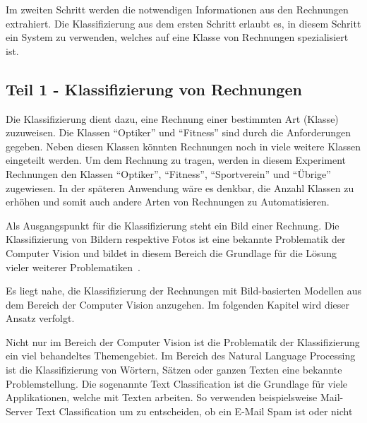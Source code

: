 Im zweiten Schritt werden die notwendigen Informationen aus den Rechnungen extrahiert. Die Klassifizierung aus dem ersten Schritt erlaubt es, in diesem Schritt ein System zu verwenden, welches auf eine Klasse von Rechnungen spezialisiert ist. 

\subsection{Teil 1 - Klassifizierung von Rechnungen}

Die Klassifizierung dient dazu, eine Rechnung einer bestimmten Art (Klasse) zuzuweisen. Die Klassen \enquote{Optiker} und \enquote{Fitness} sind durch die Anforderungen gegeben. Neben diesen Klassen könnten Rechnungen noch in viele weitere Klassen eingeteilt werden. Um dem Rechnung zu tragen, werden in diesem Experiment  Rechnungen den Klassen \enquote{Optiker}, \enquote{Fitness}, \enquote{Sportverein} und \enquote{Übrige} zugewiesen. In der späteren Anwendung wäre es denkbar, die Anzahl Klassen zu erhöhen und somit auch andere Arten von Rechnungen zu Automatisieren.

Als Ausgangspunkt für die Klassifizierung steht ein Bild einer Rechnung. Die Klassifizierung von Bildern respektive Fotos ist eine bekannte Problematik der Computer Vision und bildet in diesem Bereich die Grundlage für die Lösung vieler weiterer Problematiken~\autocite{StanfordGithubClassification}. 


Es liegt nahe, die Klassifizierung der Rechnungen mit Bild-basierten Modellen aus dem Bereich der Computer Vision anzugehen. Im folgenden Kapitel wird dieser Ansatz verfolgt.

Nicht nur im Bereich der Computer Vision ist die Problematik der Klassifizierung ein viel behandeltes Themengebiet. Im Bereich des Natural Language Processing ist die Klassifizierung von Wörtern, Sätzen oder ganzen Texten eine bekannte Problemstellung. Die sogenannte Text Classification ist die Grundlage für viele Applikationen, welche mit Texten arbeiten. So verwenden beispielsweise Mail-Server Text Classification um zu entscheiden, ob ein E-Mail Spam ist oder nicht~\autocite{GoogleTextClassification}

